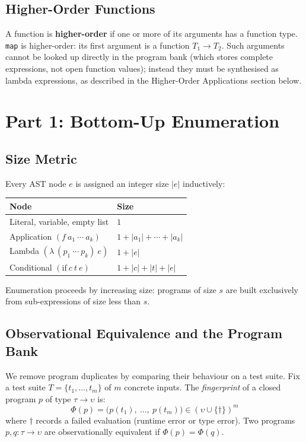 \documentclass[11pt,a4paper]{article}
\begin{document}
\subsection{Higher-Order Functions}\label{sec:hof}

A function is \textbf{higher-order} if one or more of its arguments has a function type.
\texttt{map} is higher-order: its first argument is a function $T_1 \to T_2$. Such
arguments cannot be looked up directly in the program bank (which stores complete
expressions, not open function values); instead they must be synthesised as lambda
expressions, as described in the Higher-Order Applications section below.

\section{Part 1: Bottom-Up Enumeration}\label{sec:enum}

\subsection{Size Metric}\label{sec:size}

Every AST node $e$ is assigned an integer size $\lvert e \rvert$ inductively:

\begin{center}
\begin{tabular}{ll}
\toprule
Node & Size \\
\midrule
Literal, variable, empty list
  & $1$ \\
Application $(f\ a_1\ \cdots\ a_k)$
  & $1 + \lvert a_1 \rvert + \cdots + \lvert a_k \rvert$ \\
Lambda $(\lambda\ (p_1\ \cdots\ p_k)\ e)$
  & $1 + \lvert e \rvert$ \\
Conditional $(\mathrm{if}\ c\ t\ e)$
  & $1 + \lvert c \rvert + \lvert t \rvert + \lvert e \rvert$ \\
\bottomrule
\end{tabular}
\end{center}

Enumeration proceeds by increasing size: programs of size $s$ are built exclusively from
sub-expressions of size less than $s$.

\subsection{Observational Equivalence and the Program Bank}\label{sec:oe}

We remove program duplicates by comparing their behaviour on a test suite. Fix a test suite $T = \{t_1, \ldots, t_m\}$ of $m$
concrete inputs. The \textit{fingerprint} of a closed program $p$ of type
$\tau \to \upsilon$ is:
\[
  \Phi(p) = \bigl(p(t_1),\ \ldots,\ p(t_m)\bigr) \in (\upsilon \cup \{\dagger\})^m
\]
where $\dagger$ records a failed evaluation (runtime error or type error). Two programs
$p, q : \tau \to \upsilon$ are observationally equivalent if $\Phi(p) = \Phi(q)$.
\end{document}
